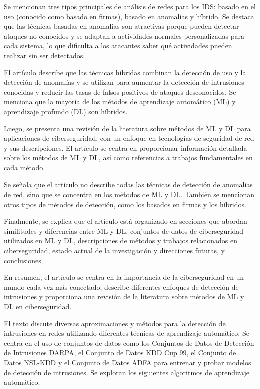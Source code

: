 \documentclass[11pt, a4paper]{article} %
\begin{document}
Se mencionan tres tipos principales de análisis de redes para los IDS: basado en el uso (conocido como basado en firmas), basado en anomalías y híbrido. Se destaca que las técnicas basadas en anomalías son atractivas porque pueden detectar ataques no conocidos y se adaptan a actividades normales personalizadas para cada sistema, lo que dificulta a los atacantes saber qué actividades pueden realizar sin ser detectados.

El artículo describe que las técnicas híbridas combinan la detección de uso y la detección de anomalías y se utilizan para aumentar la detección de intrusiones conocidas y reducir las tasas de falsos positivos de ataques desconocidos. Se menciona que la mayoría de los métodos de aprendizaje automático (ML) y aprendizaje profundo (DL) son híbridos.

Luego, se presenta una revisión de la literatura sobre métodos de ML y DL para aplicaciones de ciberseguridad, con un enfoque en tecnologías de seguridad de red y sus descripciones. El artículo se centra en proporcionar información detallada sobre los métodos de ML y DL, así como referencias a trabajos fundamentales en cada método.

Se señala que el artículo no describe todas las técnicas de detección de anomalías de red, sino que se concentra en los métodos de ML y DL. También se mencionan otros tipos de métodos de detección, como los basados en firmas y los híbridos.

Finalmente, se explica que el artículo está organizado en secciones que abordan similitudes y diferencias entre ML y DL, conjuntos de datos de ciberseguridad utilizados en ML y DL, descripciones de métodos y trabajos relacionados en ciberseguridad, estado actual de la investigación y direcciones futuras, y conclusiones.

En resumen, el artículo se centra en la importancia de la ciberseguridad en un mundo cada vez más conectado, describe diferentes enfoques de detección de intrusiones y proporciona una revisión de la literatura sobre métodos de ML y DL en ciberseguridad.


El texto discute diversas aproximaciones y métodos para la detección de intrusiones en redes utilizando diferentes técnicas de aprendizaje automático. Se centra en el uso de conjuntos de datos como los Conjuntos de Datos de Detección de Intrusiones DARPA, el Conjunto de Datos KDD Cup 99, el Conjunto de Datos NSL-KDD y el Conjunto de Datos ADFA para entrenar y probar modelos de detección de intrusiones. Se exploran los siguientes algoritmos de aprendizaje automático:
\end{document}
